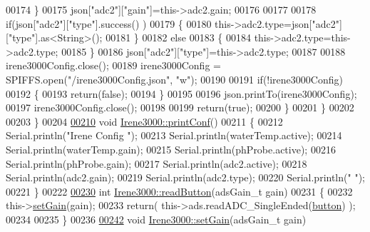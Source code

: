 \begin{DoxyCode}
00174             \}
00175             json[\textcolor{stringliteral}{"adc2"}][\textcolor{stringliteral}{"gain"}]=this->adc2.gain;
00176 
00177             
00178             \textcolor{keywordflow}{if}(json[\textcolor{stringliteral}{"adc2"}][\textcolor{stringliteral}{"type"}].success() )
00179             \{
00180                 this->adc2.type=json[\textcolor{stringliteral}{"adc2"}][\textcolor{stringliteral}{"type"}].as<String>(); 
00181             \}
00182             \textcolor{keywordflow}{else}
00183             \{
00184                 this->adc2.type=this->adc2.type;
00185             \}
00186             json[\textcolor{stringliteral}{"adc2"}][\textcolor{stringliteral}{"type"}]=this->adc2.type;
00187 
00188             irene3000Config.close();
00189             irene3000Config = SPIFFS.open(\textcolor{stringliteral}{"/irene3000Config.json"}, \textcolor{stringliteral}{"w"});
00190 
00191             \textcolor{keywordflow}{if}(!irene3000Config)
00192             \{
00193                 \textcolor{keywordflow}{return}(\textcolor{keyword}{false});
00194             \}
00195 
00196             json.printTo(irene3000Config);
00197             irene3000Config.close();
00198 
00199             \textcolor{keywordflow}{return}(\textcolor{keyword}{true}); 
00200         \}
00201     \}   
00202 
00203 \}
00204 
\hyperlink{class_irene3000_a7bc2414100b5e19eacc6630fa34b2654}{00210} \textcolor{keywordtype}{void} \hyperlink{class_irene3000_a7bc2414100b5e19eacc6630fa34b2654}{Irene3000::printConf}()
00211 \{
00212     Serial.println(\textcolor{stringliteral}{"Irene Config "});
00213     Serial.println(waterTemp.active);
00214     Serial.println(waterTemp.gain); 
00215     Serial.println(phProbe.active);
00216     Serial.println(phProbe.gain);
00217     Serial.println(adc2.active);
00218     Serial.println(adc2.gain);
00219     Serial.println(adc2.type);
00220     Serial.println(\textcolor{stringliteral}{" "});
00221 \}
00222 
\hyperlink{class_irene3000_ae0e0a5b773c3625b44c1d113c76a1540}{00230} \textcolor{keywordtype}{int} \hyperlink{class_irene3000_ae0e0a5b773c3625b44c1d113c76a1540}{Irene3000::readButton}(adsGain\_t gain)
00231 \{
00232     this->\hyperlink{class_irene3000_aff7c5da186b388e7272e63ff88a20c34}{setGain}(gain);
00233     \textcolor{keywordflow}{return}( this->ads.readADC\_SingleEnded(\hyperlink{_irene3000_8h_a37976ee6fe1fb8546bfd6153b83ffa6c}{button}) );
00234     
00235 \}
00236 
\hyperlink{class_irene3000_aff7c5da186b388e7272e63ff88a20c34}{00242} \textcolor{keywordtype}{void} \hyperlink{class_irene3000_aff7c5da186b388e7272e63ff88a20c34}{Irene3000::setGain}(adsGain\_t gain)

\end{DoxyCode}
